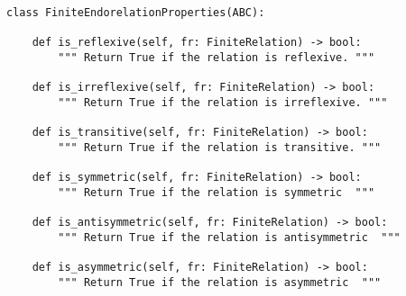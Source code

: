 \begin{verbatim}
class FiniteEndorelationProperties(ABC):

    def is_reflexive(self, fr: FiniteRelation) -> bool:
        """ Return True if the relation is reflexive. """

    def is_irreflexive(self, fr: FiniteRelation) -> bool:
        """ Return True if the relation is irreflexive. """

    def is_transitive(self, fr: FiniteRelation) -> bool:
        """ Return True if the relation is transitive. """

    def is_symmetric(self, fr: FiniteRelation) -> bool:
        """ Return True if the relation is symmetric  """

    def is_antisymmetric(self, fr: FiniteRelation) -> bool:
        """ Return True if the relation is antisymmetric  """

    def is_asymmetric(self, fr: FiniteRelation) -> bool:
        """ Return True if the relation is asymmetric  """
\end{verbatim}